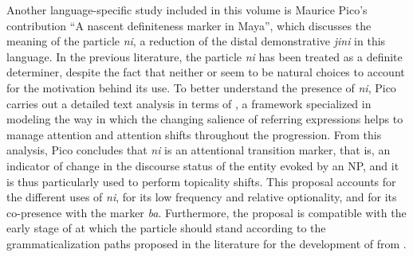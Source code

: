 \documentclass[output=paper]{langsci/langscibook}
\begin{document}
Another language-specific study included in this volume is Maurice Pico’s contribution “A nascent definiteness marker in  Maya”, which discusses the meaning of the particle \textit{ni}, a reduction of the distal demonstrative \textit{jini} in this  language. In the previous literature, the particle \textit{ni} has been treated as a definite determiner, despite the fact that neither  or  seem to be natural choices to account for the motivation behind its use. To better understand the presence of \textit{ni}, Pico carries out a detailed text analysis in terms of , a framework specialized in modeling the way in which the changing salience of referring expressions helps to manage attention and attention shifts throughout the  progression. From this analysis, Pico concludes that \textit{ni} is an attentional transition marker, that is, an indicator of change in the discourse status of the entity evoked by an NP, and it is thus particularly used to perform topicality shifts. This proposal accounts for the different uses of \textit{ni}, for its low frequency and relative optionality, and for its co-presence  with the  marker \textit{ba}. Furthermore, the proposal is compatible with the early stage of  at which the particle should stand according to the grammaticalization paths proposed in the literature for the development of  from  \citep{Greenberg1978howgender,Hawkins2004}.
\end{document}
